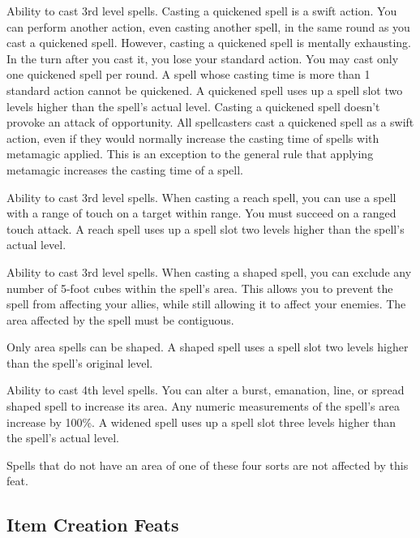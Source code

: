  Ability to cast 3rd level spells.
 Casting a quickened spell is a swift action. You can perform another action, even casting another spell, in the same round as you cast a quickened spell. However, casting a quickened spell is mentally exhausting. In the turn after you cast it, you lose your standard action. You may cast only one quickened spell per round. A spell whose casting time is more than 1 standard action cannot be quickened. A quickened spell uses up a spell slot two levels higher than the spell's actual level. Casting a quickened spell doesn't provoke an attack of opportunity.
 All spellcasters cast a quickened spell as a swift action, even if they would normally increase the casting time of spells with metamagic applied. This is an exception to the general rule that applying metamagic increases the casting time of a spell.

 Ability to cast 3rd level spells.
 When casting a reach spell, you can use a spell with a range of touch on a target within \rngclose range. You must succeed on a ranged touch attack. A reach spell uses up a spell slot two levels higher than the spell's actual level.

 Ability to cast 3rd level spells.
 When casting a shaped spell, you can exclude any number of 5-foot cubes within the spell's area. This allows you to prevent the spell from affecting your allies, while still allowing it to affect your enemies. The area affected by the spell must be contiguous.

Only area spells can be shaped. A shaped spell uses a spell slot two levels higher than the spell's original level.

 Ability to cast 4th level spells.
 You can alter a burst, emanation, line, or spread shaped spell to increase its area. Any numeric measurements of the spell's area increase by 100\%. A widened spell uses up a spell slot three levels higher than the spell's actual level.
\par Spells that do not have an area of one of these four sorts are not affected by this feat.

\subsection{Item Creation Feats}

